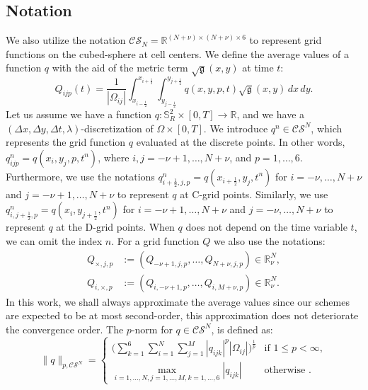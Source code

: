 \subsection{Notation}
\label{cs-notation}
We also utilize the notation $\mathcal{CS}_N=\mathbb{R}^{(N+\nu)\times(N+\nu)\times 6}$
to represent grid functions on the cubed-sphere at cell centers.
We define the average values of a function $q$ with the aid of the metric term
$\sqrt{\mathfrak{g}}(x,y)$ at time $t$: 
\begin{equation}
	\label{qav-sphere}
	Q_{ijp}(t) = \frac{1}{|\Omega_{ij}|}\int_{x_{i-\frac{1}{2}}}^{x_{i+\frac{1}{2}}}
	\int_{y_{j-\frac{1}{2}}}^{y_{j+\frac{1}{2}}}  q(x,y,p,t) {\sqrt{\mathfrak{g}}(x,y)}\,dx \,dy.
\end{equation}
Let us assume we have a function $q:\mathbb{S}^2_R\times[0,T] \to \mathbb{R}$, 
and we have a $(\Delta x, \Delta y, \Delta t, \lambda)$-discretization of $\Omega \times [0,T]$.
We introduce $q^n \in \mathcal{CS}^N$, which represents the grid function $q$
evaluated at the discrete points. 
In other words, $q^n_{ijp} = q(x_i,y_j,p,t^n)$, where $i,j=-\nu +1, \ldots, N+\nu$, and $p=1, \ldots, 6$.
Furthermore, we use the notations $q^n_{i+\frac{1}{2},j,p} = q(x_{i+\frac{1}{2}},y_j, t^n)$ 
for $i=-\nu, \ldots, N+\nu$ and $j=-\nu +1, \ldots, N+\nu$ to represent $q$ at C-grid points.
Similarly, we use $q^n_{i,j+\frac{1}{2},p} = q(x_i,y_{j+\frac{1}{2}},t^n)$ for $i=-\nu +1, \ldots, N+\nu$ and $j=-\nu, \ldots, N+\nu$ to represent $q$ at the
D-grid points.
When $q$ does not depend on the time variable $t$, we can omit the index $n$.
For a grid function $Q$ we also use the notations:
\begin{align*}
	Q_{\times,j,p} &:= (Q_{-\nu+1,j,p}, \ldots, Q_{N+\nu,j,p}) \in \mathbb{R}^{N}_{\nu},\\
	Q_{i,\times,p} &:= (Q_{i,-\nu+1,p}, \ldots, Q_{i,M+\nu,p}) \in \mathbb{R}^{N}_{\nu}.
\end{align*}
In this work, we shall always approximate the average values since our schemes are expected to be at most second-order,
this approximation does not deteriorate the convergence order.
The $p$-norm for $q \in \mathcal{CS}^N$, is defined as:
\begin{equation}
	\label{chp-advcs-pnorm}
	\|q\|_{p, \mathcal{CS}^N}=
	\begin{cases}
		\bigg( \sum_{k=1}^{6} \sum_{i=1}^{N} \sum_{j=1}^{M}|q_{ijk}|^p |\Omega_{ij}|\bigg)^{\frac{1}{p}} & \text{if } 1\leq p < \infty,\\
		\max_{i=1, \ldots, N,j=1,\ldots,M,k=1,\ldots,6}{|q_{ijk}|} & \text{otherwise }.
	\end{cases}
\end{equation}

